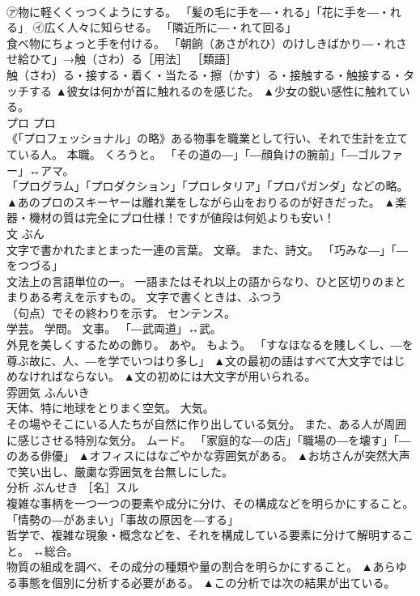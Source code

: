 \documentclass[8pt]{extreport}
\begin{document}
\begin{CJK}{UTF8}{min}
\\	㋐物に軽くくっつくようにする。 「髪の毛に手を―・れる」「花に手を―・れる」 ㋑広く人々に知らせる。 「隣近所に―・れて回る」 
\\	食べ物にちょっと手を付ける。 「朝餉（あさがれひ）のけしきばかり―・れさせ給ひて」→触（さわ）る［用法］ ［類語］
\\	触（さわ）る・接する・着く・当たる・擦（かす）る・接触する・触接する・タッチする	▲彼女は何かが首に触れるのを感じた。 ▲少女の鋭い感性に触れている。
\\	プロ	プロ	
\\	《「プロフェッショナル」の略》ある物事を職業として行い、それで生計を立てている人。 本職。 くろうと。 「その道の―」「―顔負けの腕前」「―ゴルファー」↔アマ。 
\\	「プログラム」「プロダクション」「プロレタリア」「プロパガンダ」などの略。	▲あのプロのスキーヤーは離れ業をしながら山をおりるのが好きだった。 ▲楽器・機材の質は完全にプロ仕様！ですが値段は何処よりも安い！
\\	文	ぶん	
\\	文字で書かれたまとまった一連の言葉。 文章。 また、詩文。 「巧みな―」「―をつづる」 
\\	文法上の言語単位の一。 一語またはそれ以上の語からなり、ひと区切りのまとまりある考えを示すもの。 文字で書くときは、ふつう
\\	（句点）でその終わりを示す。 センテンス。 
\\	学芸。 学問。 文事。 「―武両道」↔武。 
\\	外見を美しくするための飾り。 あや。 もよう。 「すなほなるを賤しくし、―を尊ぶ故に、人、―を学でいつはり多し」	▲文の最初の語はすべて大文字ではじめなければならない。 ▲文の初めには大文字が用いられる。
\\	雰囲気	ふんいき	
\\	天体、特に地球をとりまく空気。 大気。 
\\	その場やそこにいる人たちが自然に作り出している気分。 また、ある人が周囲に感じさせる特別な気分。 ムード。 「家庭的な―の店」「職場の―を壊す」「―のある俳優」	▲オフィスにはなごやかな雰囲気がある。 ▲お坊さんが突然大声で笑い出し、厳粛な雰囲気を台無しにした。
\\	分析	ぶんせき	［名］スル 
\\	複雑な事柄を一つ一つの要素や成分に分け、その構成などを明らかにすること。 「情勢の―があまい」「事故の原因を―する」 
\\	哲学で、複雑な現象・概念などを、それを構成している要素に分けて解明すること。 ↔総合。 
\\	物質の組成を調べ、その成分の種類や量の割合を明らかにすること。	▲あらゆる事態を個別に分析する必要がある。 ▲この分析では次の結果が出ている。

\end{CJK}
\end{document}

